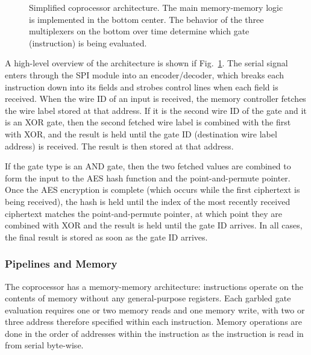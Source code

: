 \begin{figure}[ht]
	\centering
	
	\caption{Simplified coprocessor architecture. The main memory-memory logic is implemented in the bottom center. The behavior of the three multiplexers on the bottom over time determine which gate (instruction) is being evaluated.}%
	\label{fig:arch}
\end{figure}

A high-level overview of the architecture is shown if Fig.~\ref{fig:arch}. The serial signal enters through the SPI module into an encoder/decoder, which breaks each instruction down into its fields and strobes control lines when each field is received. When the wire ID of an input is received, the memory controller fetches the wire label stored at that address. If it is the second wire ID of the gate and it is an XOR gate, then the second fetched wire label is combined with the first with XOR, and the result is held until the gate ID (destination wire label address) is received. The result is then stored at that address.

If the gate type is an AND gate, then the two fetched values are combined to form the input to the AES hash function and the point-and-permute pointer. Once the AES encryption is complete (which occurs while the first ciphertext is being received), the hash is held until the index of the most recently received ciphertext matches the point-and-permute pointer, at which point they are combined with XOR and the result is held until the gate ID arrives. In all cases, the final result is stored as soon as the gate ID arrives.


\subsubsection{Pipelines and Memory}
The coprocessor has a memory-memory architecture: instructions operate on the contents of memory without any general-purpose registers. Each garbled gate evaluation requires one or two memory reads and one memory write, with two or three address therefore specified within each instruction. Memory operations are done in the order of addresses within the instruction as the instruction is read in from serial byte-wise.

